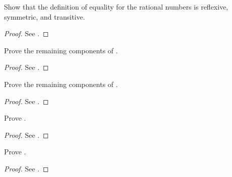 \begin{exercise} \label{exercise 4.2.1}
Show that the definition of equality for the rational numbers is reflexive, symmetric, and transitive.
\end{exercise}
\begin{proof}
See .
\end{proof}

\begin{exercise} \label{exercise 4.2.2}
Prove the remaining components of .
\end{exercise}
\begin{proof}
See .
\end{proof}

\begin{exercise} \label{exercise 4.2.3}
Prove the remaining components of .
\end{exercise}
\begin{proof}
See .
\end{proof}

\begin{exercise} \label{exercise 4.2.4}
Prove .
\end{exercise}
\begin{proof}
See .
\end{proof}

\begin{exercise}\label{exercise 4.2.5}
Prove .
\end{exercise}
\begin{proof}
See .
\end{proof}

